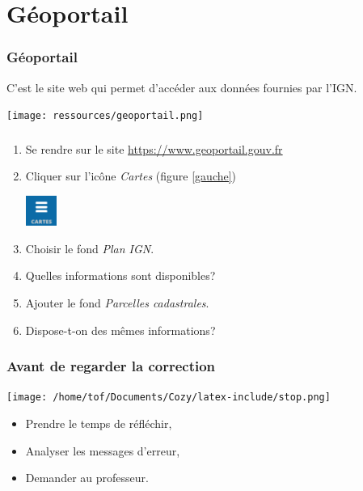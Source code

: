 \documentclass[svgnames,11pt]{beamer}
\begin{document}
\section{Géoportail}
\begin{frame}
    \frametitle{Géoportail}
C'est le site web qui permet d'accéder aux données fournies par l'IGN.
    \begin{center}
    \centering
    \texttt{[image: ressources/geoportail.png]}
    \label{IMG}
    \end{center}

\end{frame}
\begin{frame}
    \frametitle{}

    \begin{activite}
        \begin{enumerate}
            \item Se rendre sur le site \url{https://www.geoportail.gouv.fr}
            \item Cliquer sur l'icône \emph{Cartes} (figure \ref{gauche})
            \begin{center}
            \centering
            \includegraphics[width=1cm]{ressources/gauche.png}
            \label{gauche}
            \end{center}
            \item Choisir le fond \emph{Plan IGN}.
            \item Quelles informations sont disponibles?
            \item Ajouter le fond \emph{Parcelles cadastrales}.
            \item Dispose-t-on des mêmes informations?
        \end{enumerate}
        \end{activite}

\end{frame}
\begin{frame}
    \frametitle{Avant de regarder la correction}
\begin{center}
    \centering
    \texttt{[image: /home/tof/Documents/Cozy/latex-include/stop.png]}
    \end{center}
{\Large
    \begin{itemize}
        \item Prendre le temps de réfléchir,
        \item Analyser les messages d'erreur,
        \item Demander au professeur.
    \end{itemize}
}
\end{frame}
\end{document}
